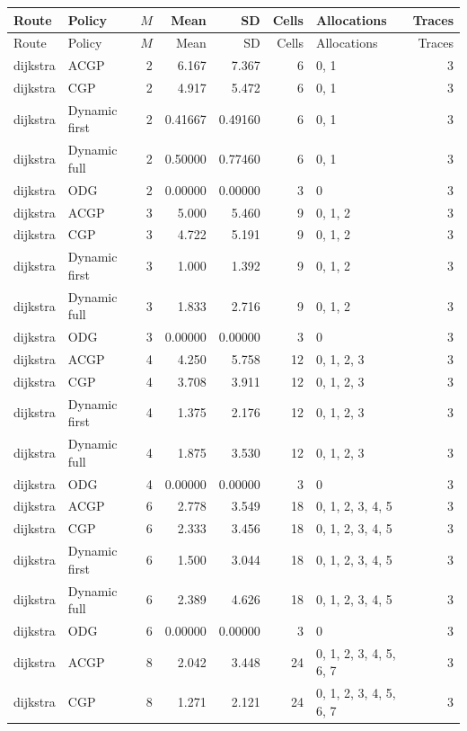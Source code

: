 \documentclass[10pt,a4paper]{article}
\begin{document}
\tiny\setlength{\tabcolsep}{2pt}\begin{longtable}{@{}p{23mm}p{29mm}rrrrp{36mm}r@{}}
\toprule Route & Policy & $M$ & Mean & SD & Cells & Allocations & Traces \\ \midrule\endfirsthead
\toprule Route & Policy & $M$ & Mean & SD & Cells & Allocations & Traces \\ \midrule\endhead
\bottomrule\endfoot
dijkstra & ACGP & 2 & 6.167 & 7.367 & 6 & 0, 1 & 3 \\
dijkstra & CGP & 2 & 4.917 & 5.472 & 6 & 0, 1 & 3 \\
dijkstra & Dynamic first & 2 & 0.41667 & 0.49160 & 6 & 0, 1 & 3 \\
dijkstra & Dynamic full & 2 & 0.50000 & 0.77460 & 6 & 0, 1 & 3 \\
dijkstra & ODG & 2 & 0.00000 & 0.00000 & 3 & 0 & 3 \\
dijkstra & ACGP & 3 & 5.000 & 5.460 & 9 & 0, 1, 2 & 3 \\
dijkstra & CGP & 3 & 4.722 & 5.191 & 9 & 0, 1, 2 & 3 \\
dijkstra & Dynamic first & 3 & 1.000 & 1.392 & 9 & 0, 1, 2 & 3 \\
dijkstra & Dynamic full & 3 & 1.833 & 2.716 & 9 & 0, 1, 2 & 3 \\
dijkstra & ODG & 3 & 0.00000 & 0.00000 & 3 & 0 & 3 \\
dijkstra & ACGP & 4 & 4.250 & 5.758 & 12 & 0, 1, 2, 3 & 3 \\
dijkstra & CGP & 4 & 3.708 & 3.911 & 12 & 0, 1, 2, 3 & 3 \\
dijkstra & Dynamic first & 4 & 1.375 & 2.176 & 12 & 0, 1, 2, 3 & 3 \\
dijkstra & Dynamic full & 4 & 1.875 & 3.530 & 12 & 0, 1, 2, 3 & 3 \\
dijkstra & ODG & 4 & 0.00000 & 0.00000 & 3 & 0 & 3 \\
dijkstra & ACGP & 6 & 2.778 & 3.549 & 18 & 0, 1, 2, 3, 4, 5 & 3 \\
dijkstra & CGP & 6 & 2.333 & 3.456 & 18 & 0, 1, 2, 3, 4, 5 & 3 \\
dijkstra & Dynamic first & 6 & 1.500 & 3.044 & 18 & 0, 1, 2, 3, 4, 5 & 3 \\
dijkstra & Dynamic full & 6 & 2.389 & 4.626 & 18 & 0, 1, 2, 3, 4, 5 & 3 \\
dijkstra & ODG & 6 & 0.00000 & 0.00000 & 3 & 0 & 3 \\
dijkstra & ACGP & 8 & 2.042 & 3.448 & 24 & 0, 1, 2, 3, 4, 5, 6, 7 & 3 \\
dijkstra & CGP & 8 & 1.271 & 2.121 & 24 & 0, 1, 2, 3, 4, 5, 6, 7 & 3 \\

\end{longtable}
\end{document}
